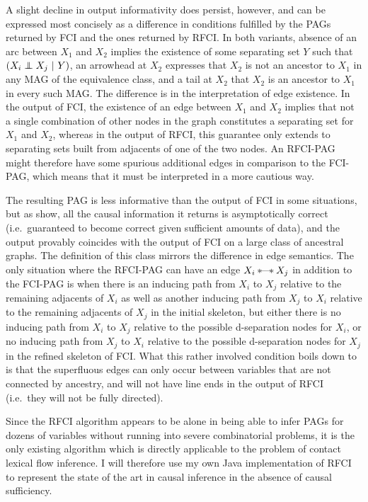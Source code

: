 A slight decline in output informativity does persist, however, and can be expressed most concisely as a difference in conditions fulfilled by the PAGs returned by FCI and the ones returned by RFCI. In both variants, absence of an arc between $X_1$ and $X_2$ implies the existence of some separating set $Y$ such that $(X_i \indep X_j\ |\ Y)$, an arrowhead at $X_2$ expresses that $X_2$ is not an ancestor to $X_1$ in any MAG of the equivalence class, and a tail at $X_2$ that $X_2$ is an ancestor to $X_1$ in every such MAG. The difference is in the interpretation of edge existence. In the output of FCI, the existence of an edge between $X_1$ and $X_2$ implies that not a single combination of other nodes in the graph constitutes a separating set for $X_1$ and $X_2$, whereas in the output of RFCI, this guarantee only extends to separating sets built from adjacents of one of the two nodes. An RFCI-PAG might therefore have some spurious additional edges in comparison to the FCI-PAG, which means that it must be 
interpreted in a more cautious way.

The resulting PAG is less informative than the output of FCI in some situations, but as \cite{colombo_ea_2012} show, all the causal information it returns is asymptotically correct (i.e.\ guaranteed to become correct given sufficient amounts of data), and the output provably coincides with the output of FCI on a large class of ancestral graphs. The definition of this class mirrors the difference in edge semantics. The only situation where the RFCI-PAG can have an edge $X_i \kern 2pt\hbox{$\ast$}\kern-1.5pt\hbox{---}\kern-1.5pt\hbox{$\ast$}\kern 2pt X_j$ in addition to the FCI-PAG is when there is an inducing path from $X_i$ to $X_j$ relative to the remaining adjacents of $X_i$ as well as another inducing path from $X_j$ to $X_i$ relative to the remaining adjacents of $X_j$ in the initial skeleton, but either there is no inducing path from $X_i$ to $X_j$ relative to the possible d-separation nodes for $X_i$, or no inducing path from $X_j$ to $X_i$ relative to the possible d-separation nodes for $X_j$ in the refined skeleton of FCI. What this rather involved condition boils 
down to is that the superfluous edges can only occur between variables that are not connected by ancestry, and will not have line ends in the output of RFCI (i.e.\ they will not be fully directed).

Since the RFCI algorithm appears to be alone in being able to infer PAGs for dozens of variables without running into severe combinatorial problems, it is the only existing algorithm which is directly applicable to the problem of contact lexical flow inference. I will therefore use my own Java implementation of RFCI to represent the state of the art in causal inference in the absence of causal sufficiency.

